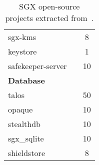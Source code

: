 \begin{table}[h]
\begin{tabular}{lcc}
		\midrule
		sgx-kms & \checkmark & 8 \\
		keystore & \checkmark & 1 \\
		safekeeper-server & \checkmark & 10 \\ \midrule
		\multicolumn{3}{l}{\textbf{Database}} \\ \midrule
		talos & \checkmark & 50 \\
		opaque & \checkmark & 10 \\
		stealthdb & \checkmark & 10 \\
		sgx\_sqlite & \checkmark & 10 \\
		shieldstore & \checkmark & 8 \\
		\bottomrule		
	\end{tabular}
	\caption{SGX open-source projects extracted from~\cite{asop}.}
	\label{tbl:sgx-open-source-prj}
\end{table}